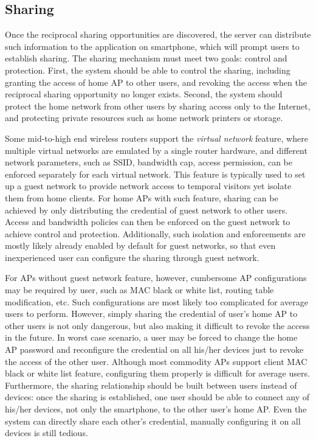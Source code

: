 \subsection{Sharing}
\label{subsec:sharing}

Once the reciprocal sharing opportunities are discovered, the \wisefi{} server
can distribute such information to the \wisefi{} application on smartphone,
which will prompt users to establish \wifi{} sharing. The sharing mechanism must
meet two goals: control and protection. First, the system should be able to
control the sharing, including granting the access of home AP to other \wisefi{}
users, and revoking the access when the reciprocal sharing opportunity no longer
exists.  Second, the system should protect the home network from other \wisefi{}
users by sharing access only to the Internet, and protecting private resources
such as home network printers or storage.

Some mid-to-high end wireless routers support the \textit{virtual network}
feature, where multiple virtual \wifi{} networks are emulated by a single router
hardware, and different network parameters, such as SSID, bandwidth cap, access
permission, can be enforced separately for each virtual network. This feature is
typically used to set up a guest \wifi{} network to provide network access to
temporal visitors yet isolate them from home clients. For home APs with such
feature, \wifi{} sharing can be achieved by only distributing the credential of
guest network to other \wisefi{} users. Access and bandwidth policies can then
be enforced on the guest network to achieve control and protection.
Additionally, such isolation and enforcements are mostly likely already enabled
by default for guest networks, so that even inexperienced user can configure the
\wifi{} sharing through guest network.

For APs without guest network feature, however, cumbersome AP configurations may
be required by user, such as MAC black or white list, routing table
modification, etc. Such configurations are most likely too complicated for
average users to perform. However, simply sharing the \wifi{} credential of user's
home AP to other \wisefi{} users is not only dangerous, but also making it
difficult to revoke the access in the future. In worst case scenario, a user may
be forced to change the home AP password and reconfigure the \wifi{} credential
on all his/her devices just to revoke the access of the other \wisefi{} user.
Although most commodity APs support client MAC black or white list feature,
configuring them properly is difficult for average users. Furthermore, the
sharing relationship should be built between users instead of devices: once the
sharing is established, one user should be able to connect any of his/her
devices, not only the smartphone, to the other user's home AP. Even the system
can directly share each other's \wifi{} credential, manually configuring it on
all devices is still tedious.

